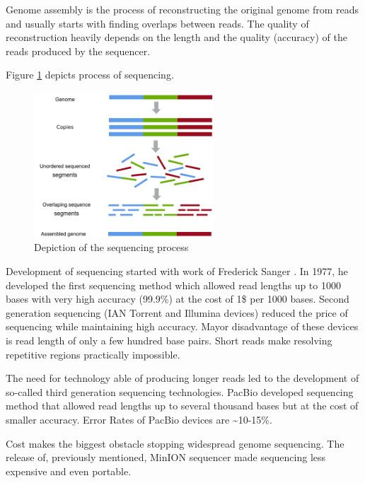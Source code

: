 \documentclass[times, utf8, diplomski, numeric, english]{fer}
\begin{document}
Genome assembly is the process of reconstructing the original genome from reads and usually starts with finding overlaps between reads.
The quality of reconstruction heavily depends on the length and the quality (accuracy) of the reads produced by the sequencer.

Figure \ref{fg:sequencing} depicts process of sequencing.

\begin{figure}[!ht]
	\begin{center}
		\includegraphics[width=0.6\textwidth]{./imgs/sequencing.png}
		\caption{Depiction of the sequencing process}
		\label{fg:sequencing}
	\end{center}
\end{figure}


Development of sequencing started with work of Frederick Sanger \cite{mile} \cite{Pettersson2009}. In 1977, he developed the first sequencing method which allowed 
read lengths up to 1000 bases with very high accuracy (99.9\%) at the cost of 1\$ per 1000 bases.
Second generation sequencing (IAN Torrent and Illumina devices) reduced the price of sequencing while maintaining high accuracy. Mayor disadvantage of these devices is read length of only a few hundred base pairs. Short reads make resolving repetitive regions practically impossible.

The need for technology able of producing longer reads led to the development of so-called third generation sequencing technologies.
PacBio developed sequencing method that allowed read lengths up to several thousand bases but at the cost of smaller accuracy. Error Rates of PacBio devices are \textasciitilde10-15\%. 

Cost makes the biggest obstacle stopping widespread genome sequencing. The release of, previously mentioned, MinION sequencer made sequencing less expensive and even portable.
\end{document}

